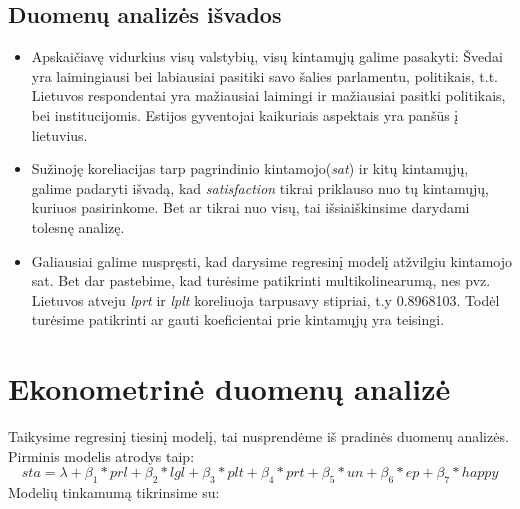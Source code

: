 \documentclass[12pt,a4paper]{article}
\theoremstyle{change}\newtheorem{salyga}{Uždavinys}
\begin{document}
\subsection{Duomenų analizės išvados}
\begin{itemize}
\item Apskaičiavę vidurkius visų valstybių, visų kintamųjų galime pasakyti:
\newline  Švedai yra laimingiausi bei labiausiai pasitiki savo šalies parlamentu, politikais, t.t. Lietuvos respondentai yra mažiausiai laimingi ir mažiausiai pasitki politikais, bei institucijomis. Estijos gyventojai  kaikuriais aspektais yra panšūs į lietuvius.
\item Sužinoję koreliacijas tarp pagrindinio kintamojo(\textit{sat}) ir kitų kintamųjų, galime padaryti išvadą, kad \textit{satisfaction} tikrai priklauso nuo tų kintamųjų, kuriuos pasirinkome. Bet ar tikrai nuo visų, tai išsiaiškinsime darydami tolesnę analizę. 
\item Galiausiai galime nuspręsti, kad darysime regresinį modelį atžvilgiu kintamojo sat. Bet dar pastebime, kad turėsime patikrinti multikolinearumą, nes pvz. Lietuvos atveju \textit{lprt} ir \textit{lplt} koreliuoja tarpusavy stipriai, t.y 0.8968103. Todėl turėsime patikrinti ar gauti koeficientai prie kintamųjų yra teisingi.

\end{itemize}

\newpage


\section{Ekonometrinė duomenų analizė}

Taikysime regresinį tiesinį modelį, tai nusprendėme iš pradinės duomenų analizės. Pirminis modelis atrodys taip:
\begin{equation}
sta=\lambda +\beta_{1}*prl+\beta _{2}*lgl+\beta _{3}*plt+\beta_{4}*prt+\beta_{5}*un+\beta_{6}*ep+\beta_{7}*happy 
\end {equation}
 Modelių tinkamumą tikrinsime su:
\end{document}
